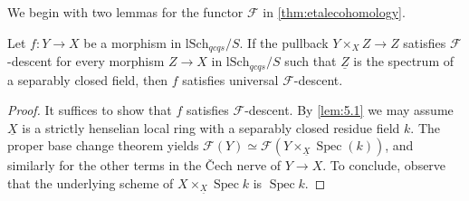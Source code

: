 \documentclass[10pt]{amsart}
\newcommand{\cF}{\mathcal{F}}
\DeclareMathOperator{\Spec}{Spec}
\newcommand{\ul}{\underline}
\newcommand{\lSch}{\mathrm{lSch}}
\begin{document}
We begin with two lemmas for the functor $\cF$ in \cref{thm:etalecohomology}.

\begin{lemma}
\label{lem:reduction}
Let $f\colon Y\to X$ be a morphism in $\lSch_{qcqs}/S$.
If the pullback $Y\times_X Z\to Z$ satisfies $\cF$-descent for every morphism $Z\to X$ in 
$\lSch_{qcqs}/S$ such that $\ul{Z}$ is the spectrum of a separably closed field,
then $f$ satisfies universal $\cF$-descent.
\end{lemma}
\begin{proof}
It suffices to show that $f$ satisfies $\cF$-descent. 
By \cref{lem:5.1} we may assume $\ul{X}$ is a strictly henselian 
local ring with a separably closed residue field $k$.
The proper base change theorem \cite[Theorem 5.1]{MR1457738} yields 
$\cF(Y)\simeq \cF(Y\times_{\ul{X}} \Spec(k))$, 
and similarly for the other terms in the \v{C}ech nerve of $Y\to X$. 
To conclude,
observe that the underlying scheme of $X\times_{\ul{X}}\Spec{k}$ is $\Spec{k}$.
\end{proof}
\end{document}
